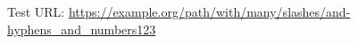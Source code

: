 \documentclass{article}
\begin{document}
Test URL: \url{https://example.org/path/with/many/slashes/and-hyphens_and_numbers123}
\useOriginalUrlSetting
\end{document}
